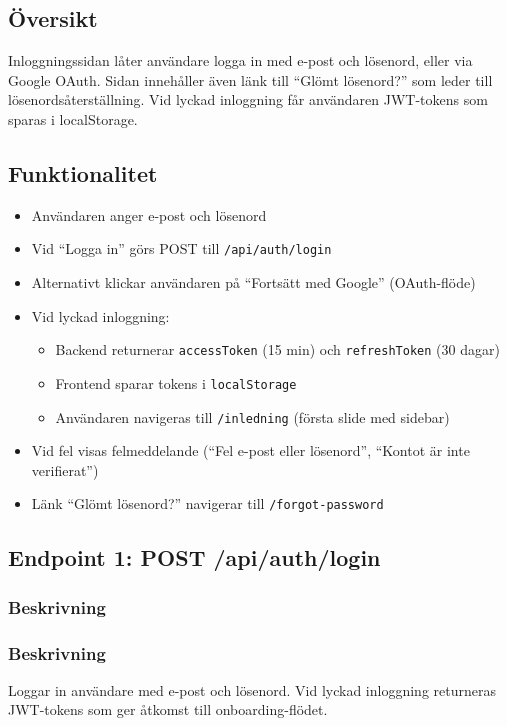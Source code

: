 \documentclass[12pt,a4paper]{article}
\begin{document}
\subsection{Översikt}
Inloggningssidan låter användare logga in med e-post och lösenord, eller via Google OAuth. Sidan innehåller även länk till ``Glömt lösenord?'' som leder till lösenordsåterställning. Vid lyckad inloggning får användaren JWT-tokens som sparas i localStorage.

\subsection{Funktionalitet}
\begin{itemize}[noitemsep]
  \item Användaren anger e-post och lösenord
  \item Vid ``Logga in'' görs POST till \texttt{/api/auth/login}
  \item Alternativt klickar användaren på ``Fortsätt med Google'' (OAuth-flöde)
  \item Vid lyckad inloggning:
  \begin{itemize}
    \item Backend returnerar \texttt{accessToken} (15 min) och \texttt{refreshToken} (30 dagar)
    \item Frontend sparar tokens i \texttt{localStorage}
    \item Användaren navigeras till \texttt{/inledning} (första slide med sidebar)
  \end{itemize}
  \item Vid fel visas felmeddelande (``Fel e-post eller lösenord'', ``Kontot är inte verifierat'')
  \item Länk ``Glömt lösenord?'' navigerar till \texttt{/forgot-password}
\end{itemize}

\subsection{Endpoint 1: POST /api/auth/login}

\subsubsection{Beskrivning}
\subsubsection{Beskrivning}
Loggar in användare med e-post och lösenord. Vid lyckad inloggning returneras JWT-tokens som ger åtkomst till onboarding-flödet.
\end{document}
